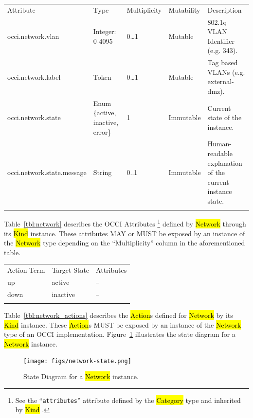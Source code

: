 \documentclass[10pt,a4paper]{article}
\begin{document}
{
	\begin{tabular}{lp{2.5cm}p{1cm}lp{5cm}}
	\toprule
	Attribute&Type&Multi\-plicity&Mutability&Description\\
	\colrule
	occi.network.vlan & Integer: 0-4095 & 0\ldots1 & Mutable
	& 802.1q VLAN Identifier (e.g. 343).\\
	occi.network.label & Token & 0\ldots1 & Mutable
	& Tag based VLANs (e.g. external-dmz).\\
	occi.network.state & Enum \{active, inactive, error\} & 1 & Immutable
	& Current state of the instance.\\
	occi.network.state.message & String & 0..1 & Immutable
	& Human-readable explanation of the current instance state.\\
	\botrule
	\end{tabular}
}

Table~\ref{tbl:network} describes the OCCI Attributes%
\footnote{See the ``{\tt attributes}'' attribute defined by the
  \hl{Category} type and inherited by \hl{Kind} \cite{occi:core}.}
defined by \hl{Network} through its \hl{Kind} instance. These attributes
MAY or MUST be exposed by an instance of the \hl{Network} type
depending on the ``Multiplicity'' column in the aforementioned table.

{
	\begin{tabular}{lll}
	\toprule
	Action Term&Target State&Attributes\\
	\colrule
	up & active & --\\
	down & inactive & --\\
	\botrule
	\end{tabular}
}

Table~\ref{tbl:network_actions} describes the \hl{Action}s defined for
\hl{Network} by its \hl{Kind} instance. These \hl{Action}s MUST be
exposed by an instance of the \hl{Network} type of an OCCI
implementation.  Figure~\ref{fig:network_state} illustrates the state
diagram for a \hl{Network} instance.

\begin{figure}[!h]
	\centering
	\texttt{[image: figs/network-state.png]}
	\caption{State Diagram for a \hl{Network} instance.}
	\label{fig:network_state}
\end{figure}
\end{document}
